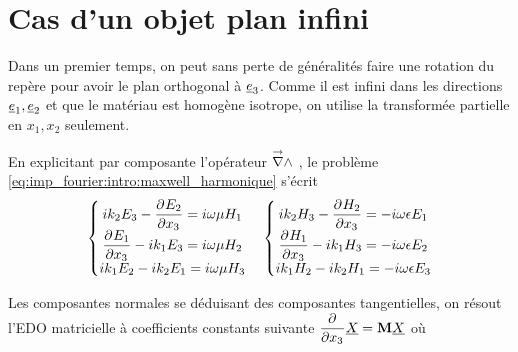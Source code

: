 \section{Cas d'un objet plan infini}



    Dans un premier temps, on peut sans perte de généralités faire une rotation du repère pour avoir le plan orthogonal à $\v e_3$. Comme il est infini dans les directions $\v e_1, \v e_2$ et que le matériau est homogène isotrope, on utilise la transformée partielle en $x_1, x_2$ seulement.

    En explicitant par composante l'opérateur $\vrot$ , le problème \eqref{eq:imp_fourier:intro:maxwell_harmonique} s'écrit  
    \begin{align*}
        \left\lbrace 
        \begin{matrix}
        ik_2 E_3  - \ddr{x_3}{E_ 2} = i \w \mu H_1 \\
        \ddr{x_3}{E_1} - ik_1 E_3 = i\w \mu H_2 \\
        ik_1 E_2 - ik_2 E_1 = i\w \mu H_3 \\
        \end{matrix}
        \right. \quad 
        \left\lbrace 
        \begin{matrix}
        ik_2 H_3  - \ddr{x_3}{H_ 2} = -i \w \eps E_1 \\
        \ddr{x_3}{H_1} - ik_1 H_3 = -i\w \eps E_2 \\
        ik_1 H_2 - ik_2 H_1 = -i\w \eps E_3 \\
        \end{matrix}
        \right.
    \end{align*}

    Les composantes normales se déduisant des composantes tangentielles, on résout l'EDO matricielle à coefficients constants 
    suivante $\ddr{x_3}{}\v{X} = \mat{M} \v{X}$ où

